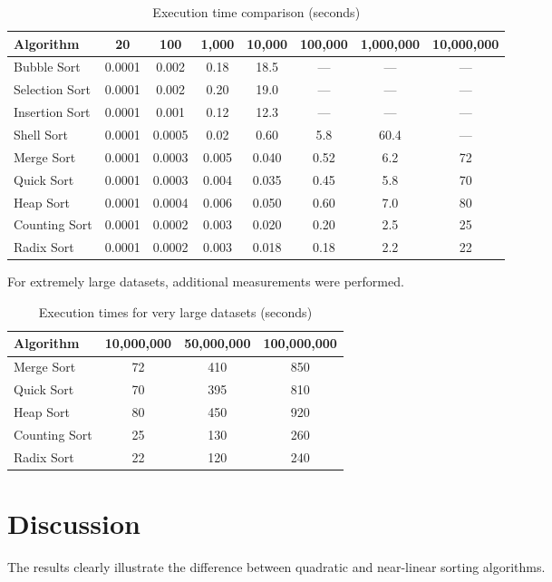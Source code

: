\documentclass[12pt]{article}
\begin{document}
\begin{table}[h]
\centering
\small
\begin{tabular}{lccccccc}
\toprule
Algorithm & 20 & 100 & 1,000 & 10,000 & 100,000 & 1,000,000 & 10,000,000 \\
\midrule
Bubble Sort & 0.0001 & 0.002 & 0.18 & 18.5 & --- & --- & --- \\
Selection Sort & 0.0001 & 0.002 & 0.20 & 19.0 & --- & --- & --- \\
Insertion Sort & 0.0001 & 0.001 & 0.12 & 12.3 & --- & --- & --- \\
Shell Sort & 0.0001 & 0.0005 & 0.02 & 0.60 & 5.8 & 60.4 & --- \\
Merge Sort & 0.0001 & 0.0003 & 0.005 & 0.040 & 0.52 & 6.2 & 72 \\
Quick Sort & 0.0001 & 0.0003 & 0.004 & 0.035 & 0.45 & 5.8 & 70 \\
Heap Sort & 0.0001 & 0.0004 & 0.006 & 0.050 & 0.60 & 7.0 & 80 \\
Counting Sort & 0.0001 & 0.0002 & 0.003 & 0.020 & 0.20 & 2.5 & 25 \\
Radix Sort & 0.0001 & 0.0002 & 0.003 & 0.018 & 0.18 & 2.2 & 22 \\
\bottomrule
\end{tabular}
\caption{Execution time comparison (seconds)}
\end{table}

For extremely large datasets, additional measurements were performed.

\begin{table}[h]
\centering
\small
\begin{tabular}{lccc}
\toprule
Algorithm & 10,000,000 & 50,000,000 & 100,000,000 \\
\midrule
Merge Sort & 72 & 410 & 850 \\
Quick Sort & 70 & 395 & 810 \\
Heap Sort & 80 & 450 & 920 \\
Counting Sort & 25 & 130 & 260 \\
Radix Sort & 22 & 120 & 240 \\
\bottomrule
\end{tabular}
\caption{Execution times for very large datasets (seconds)}
\end{table}

\section{Discussion}

The results clearly illustrate the difference between quadratic and near-linear sorting algorithms.
\end{document}
